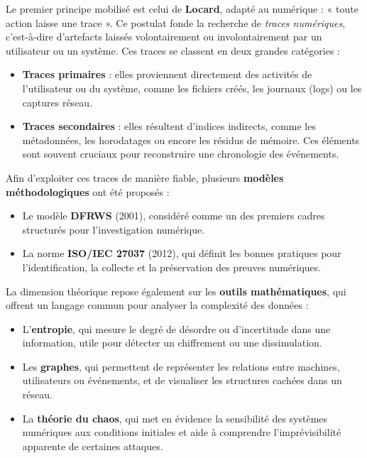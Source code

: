 \documentclass[memoire, 12pt]{report}
\begin{document}
Le premier principe mobilisé est celui de \textbf{Locard}, adapté au numérique : 
« toute action laisse une trace ». Ce postulat fonde la recherche de \emph{traces numériques}, 
c’est-à-dire d’artefacts laissés volontairement ou involontairement par un utilisateur 
ou un système. Ces traces se classent en deux grandes catégories :  

\begin{itemize}
  \item \textbf{Traces primaires} : elles proviennent directement des activités de 
  l’utilisateur ou du système, comme les fichiers créés, les journaux (logs) ou les 
  captures réseau.  

  \item \textbf{Traces secondaires} : elles résultent d’indices indirects, comme les 
  métadonnées, les horodatages ou encore les résidus de mémoire. Ces éléments sont 
  souvent cruciaux pour reconstruire une chronologie des événements.  
\end{itemize}

Afin d’exploiter ces traces de manière fiable, plusieurs \textbf{modèles méthodologiques} 
ont été proposés :  

\begin{itemize}
  \item Le modèle \textbf{DFRWS} (2001), considéré comme un des premiers cadres 
  structurés pour l’investigation numérique.  

  \item La norme \textbf{ISO/IEC 27037} (2012), qui définit les bonnes pratiques 
  pour l’identification, la collecte et la préservation des preuves numériques.  
\end{itemize}

La dimension théorique repose également sur les \textbf{outils mathématiques}, 
qui offrent un langage commun pour analyser la complexité des données :  

\begin{itemize}
  \item L’\textbf{entropie}, qui mesure le degré de désordre ou d’incertitude 
  dans une information, utile pour détecter un chiffrement ou une dissimulation.  

  \item Les \textbf{graphes}, qui permettent de représenter les relations entre 
  machines, utilisateurs ou événements, et de visualiser les structures cachées 
  dans un réseau.  

  \item La \textbf{théorie du chaos}, qui met en évidence la sensibilité des 
  systèmes numériques aux conditions initiales et aide à comprendre 
  l’imprévisibilité apparente de certaines attaques.  
\end{itemize}
\end{document}

